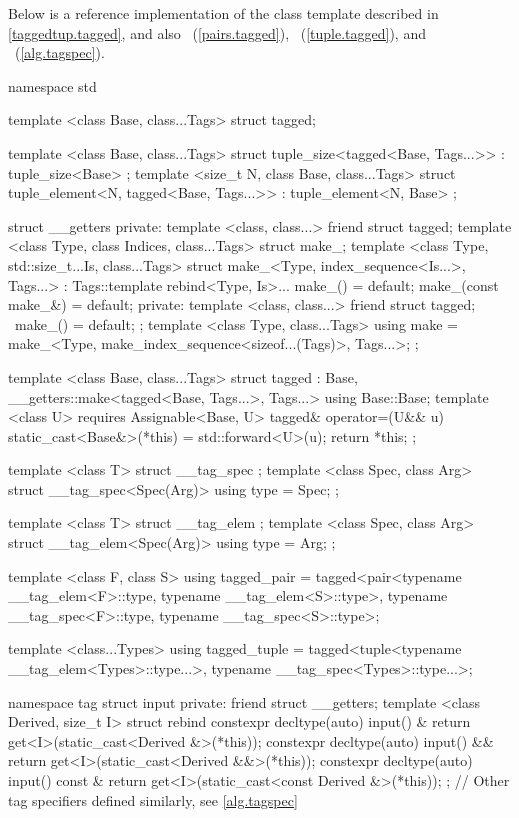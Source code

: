 {\color{newclr}

\pnum Below is a reference implementation of the  class template described in
\ref{taggedtup.tagged}, and also ~(\ref{pairs.tagged}),
~(\ref{tuple.tagged}), and ~(\ref{alg.tagspec}).

\begin{codeblock}
namespace std {
  template <class Base, class...Tags>
  struct tagged;

  template <class Base, class...Tags>
  struct tuple_size<tagged<Base, Tags...>>
    : tuple_size<Base> { };
  template <size_t N, class Base, class...Tags>
  struct tuple_element<N, tagged<Base, Tags...>>
    : tuple_element<N, Base> { };

  struct __getters {
  private:
    template <class, class...> friend struct tagged;
    template <class Type, class Indices, class...Tags>
    struct make_;
    template <class Type, std::size_t...Is, class...Tags>
    struct make_<Type, index_sequence<Is...>, Tags...>
      : Tags::template rebind<Type, Is>... {
      make_() = default;
      make_(const make_&) = default;
    private:
      template <class, class...> friend struct tagged;
      ~make_() = default;
    };
    template <class Type, class...Tags>
    using make = make_<Type, make_index_sequence<sizeof...(Tags)>, Tags...>;
  };

  template <class Base, class...Tags>
  struct tagged
    : Base, __getters::make<tagged<Base, Tags...>, Tags...> {
    using Base::Base;
    template <class U>
      requires Assignable<Base, U>
    tagged& operator=(U&& u) {
      static_cast<Base&>(*this) = std::forward<U>(u);
      return *this;
    }
  };

  template <class T>
  struct __tag_spec { };
  template <class Spec, class Arg>
  struct __tag_spec<Spec(Arg)> { using type = Spec; };

  template <class T>
  struct __tag_elem { };
  template <class Spec, class Arg>
  struct __tag_elem<Spec(Arg)> { using type = Arg; };

  template <class F, class S>
  using tagged_pair =
    tagged<pair<typename __tag_elem<F>::type, typename __tag_elem<S>::type>,
           typename __tag_spec<F>::type, typename __tag_spec<S>::type>;

  template <class...Types>
  using tagged_tuple =
    tagged<tuple<typename __tag_elem<Types>::type...>,
           typename __tag_spec<Types>::type...>;

  namespace tag {
    struct input {
    private:
      friend struct __getters;
      template <class Derived, size_t I>
      struct rebind {
        constexpr decltype(auto) input() & {
          return get<I>(static_cast<Derived &>(*this));
        }
        constexpr decltype(auto) input() && {
          return get<I>(static_cast<Derived &&>(*this));
        }
        constexpr decltype(auto) input() const & {
          return get<I>(static_cast<const Derived &>(*this));
        }
      };
    }
    // Other tag specifiers defined similarly, see \ref{alg.tagspec}
  }
}
\end{codeblock}
}
